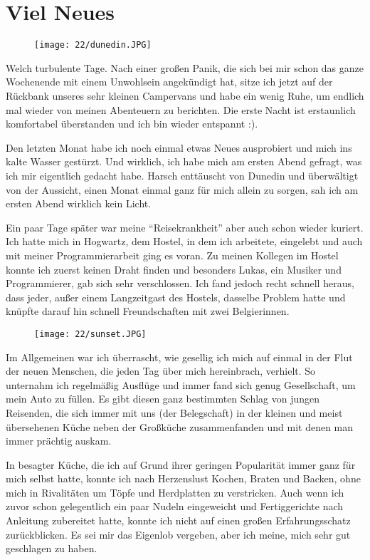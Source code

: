 \chapter{Viel Neues}

\begin{figure}[h]
  \centering
  \texttt{[image: 22/dunedin.JPG]}
\end{figure}
Welch turbulente Tage. Nach einer großen Panik, die sich bei mir schon
das ganze Wochenende mit einem Unwohlsein angekündigt hat, sitze ich
jetzt auf der Rückbank unseres sehr kleinen Campervans und habe ein
wenig Ruhe, um endlich mal wieder von meinen Abenteuern zu berichten.
Die erste Nacht ist erstaunlich komfortabel überstanden und ich bin
wieder entspannt :).

Den letzten Monat habe ich noch einmal etwas Neues ausprobiert und mich
ins kalte Wasser gestürzt. Und wirklich, ich habe mich am ersten Abend
gefragt, was ich mir eigentlich gedacht habe. Harsch enttäuscht von
Dunedin und überwältigt von der Aussicht, einen Monat einmal ganz für
mich allein zu sorgen, sah ich am ersten Abend wirklich kein Licht.

Ein paar Tage später war meine ``Reisekrankheit'' aber auch schon wieder
kuriert. Ich hatte mich in Hogwartz, dem Hostel, in dem ich arbeitete,
eingelebt und auch mit meiner Programmierarbeit ging es voran. Zu
meinen Kollegen im Hostel konnte ich zuerst keinen Draht finden und
besonders Lukas, ein Musiker und Programmierer, gab sich sehr
verschlossen. Ich fand jedoch recht schnell heraus, dass jeder, außer
einem Langzeitgast des Hostels, dasselbe Problem hatte und knüpfte
darauf hin schnell Freundschaften mit zwei Belgierinnen.

\begin{figure}[h]
  \centering
  \texttt{[image: 22/sunset.JPG]}
\end{figure}
Im Allgemeinen war ich überrascht, wie gesellig ich mich auf einmal in
der Flut der neuen Menschen, die jeden Tag über mich hereinbrach,
verhielt. So unternahm ich regelmäßig Ausflüge und immer fand sich
genug Gesellschaft, um mein Auto zu füllen.  Es gibt diesen ganz
bestimmten Schlag von jungen Reisenden, die sich immer mit uns (der
Belegschaft) in der kleinen und meist übersehenen Küche neben der
Großküche zusammenfanden und mit denen man immer prächtig auskam.

In besagter Küche, die ich auf Grund ihrer geringen Popularität immer
ganz für mich selbst hatte, konnte ich nach Herzenslust Kochen, Braten
und Backen, ohne mich in Rivalitäten um Töpfe und Herdplatten zu
verstricken. Auch wenn ich zuvor schon gelegentlich ein paar Nudeln
eingeweicht und Fertiggerichte nach Anleitung zubereitet hatte, konnte
ich nicht auf einen großen Erfahrungsschatz zurückblicken.  Es sei mir
das Eigenlob vergeben, aber ich meine, mich sehr gut geschlagen zu
haben.

